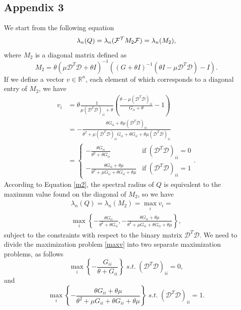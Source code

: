 \documentclass[letterpaper]{article} %
\begin{document}
 \subsection*{Appendix 3}
 We start from the following equation
 \begin{equation} \label{m2}
     \lambda_n(Q)  = \lambda_n({\cal F^T} M_2 {\cal F}) = \lambda_n(M_2),
 \end{equation}
where $M_2$ is a diagonal matrix defined as
 \begin{equation*}\label{iterdeblurring}
	 M_2=\theta(\mu \mathcal{D}^T \mathcal{D}+\theta I)^{-1} ( ( G +\theta I)^{-1} (\theta I -  \mu \mathcal{D}^T \mathcal{D} ) - I).
\end{equation*}
If we define a vector $v \in \mathbb{R}^n$, each element of which corresponds to a diagonal entry of $M_2$, we have
\begin{equation*}\label{iterdeblurring}
\begin{split}
	 v_i&=\theta \frac{1}{\mu(\mathcal{D}^T \mathcal{D})_{ii}+\theta}  \left(\frac{\theta -  \mu (\mathcal{D}^T \mathcal{D})_{ii} }{ G_{ii} +\theta }   - 1\right)\\
         &=-\frac{\theta G_{ii}+\theta\mu (\mathcal{D}^T \mathcal{D})_{ii}}{\theta^2+\mu (\mathcal{D}^T \mathcal{D})_{ii} G_{ii}+\theta G_{ii}+\theta\mu (\mathcal{D}^T \mathcal{D})_{ii}}\\
         &=  \begin{cases}
            -\frac{\theta G_{ii}}{\theta^2+\theta G_{ii}}& \text{if}\;(\mathcal{D}^T \mathcal{D})_{ii}= 0\\
		-\frac{\theta G_{ii}+\theta\mu }{\theta^2+\mu G_{ii}+\theta G_{ii}+\theta\mu } & \text{if}\;(\mathcal{D}^T \mathcal{D})_{ii}= 1
	\end{cases}.
 \end{split}
\end{equation*}
According to Equation \eqref{m2}, the spectral radius of $Q$ is equivalent to the maximum value found on the diagonal of $M_2$, so we have
\begin{multline} \label{maxv}
    \lambda_n(Q)   = \lambda_n(M_2) = \max_i v_i   = \\
  \max_i \left \{ -\frac{\theta G_{ii}}{\theta^2+\theta G_{ii}},  -\frac{\theta G_{ii}+\theta\mu }{\theta^2+\mu G_{ii}+\theta G_{ii}+\theta\mu } \right\},
\end{multline}
subject to the constraints with respect to the binary matrix $\mathcal{D}^T \mathcal{D}$. We need to divide the maximization problem \eqref{maxv} into two separate maximization problems, as follows
\begin{equation} \label{max1}
\max_i \left \{ -\frac{ G_{ii}}{\theta+G_{ii}}\right\}  \; s.t. \; (\mathcal{D}^T\mathcal{D})_{ii} = 0,
\end{equation}
and
\begin{equation} \label{max2}
\max_i \left \{ -\frac{\theta G_{ii}+\theta\mu }{\theta^2+\mu G_{ii}+\theta G_{ii}+\theta\mu }  \right\}  \; s.t. \; (\mathcal{D}^T\mathcal{D})_{ii} = 1.
\end{equation}
\end{document}
